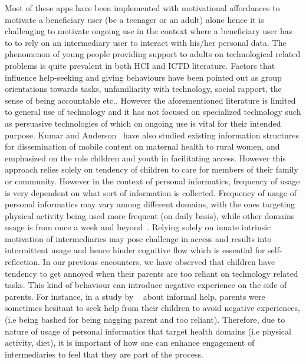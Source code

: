 \documentclass{sig-alternate}
\begin{document}
Most of these apps have been implemented with motivational affordances to motivate a beneficiary user (be a teenager or an adult) alone hence it is challenging to motivate ongoing use in the context where a beneficiary user has to to rely on an intermediary user to interact with his/her personal data. The phenomenon of young people providing support to adults on technological related problems is quite prevalent in both HCI and ICTD literature. Factors that influence help-seeking and giving behaviours have been pointed out as group orientations towards tasks, unfamiliarity with technology, social rapport, the sense of being accountable etc.\cite{sambasivan2010,poole:chh,kiesler:twi,parikh2006}. However the aforementioned literature is limited to general use of technology and it has not focused on specialized technology such as persuasive technologies of which on ongoing use is vital for their intended purpose. Kumar and Anderson~\cite{kumar2015mobile} have also studied existing information structures for dissemination of mobile content on maternal health to rural women, and emphasized on the role children and youth in facilitating access. However this approach relies solely on tendency of children to care for members of their family or community. However in the context of personal informatics, frequency of usage is very dependent on what sort of information is collected. Frequency of usage of personal informatics may vary among different domains, with the ones targeting physical activity being used more frequent (on daily basis), while other domains usage is from once a week and beyond~\cite{epstein2015lived}. Relying solely on innate intrinsic motivation of intermediaries may pose challenge in access and results into intermittent usage and hence hinder cognitive flow which is essential for self-reflection. In our previous encounters, we have observed that children have tendency to get annoyed when their parents are too reliant on technology related tasks. This kind of behaviour can introduce negative experience on the side of parents. For instance, in a study by ~\cite{kiesler:twi} about informal help, parents were sometimes hesitant to seek help from their children to avoid negative experiences, (i.e being bashed for being nagging parent and too reliant). Therefore, due to nature of usage of personal informatics that target health domains (i.e physical activity, diet), it is important of how one can enhance engagement of intermediaries to feel that they are part of the process.
\end{document}
